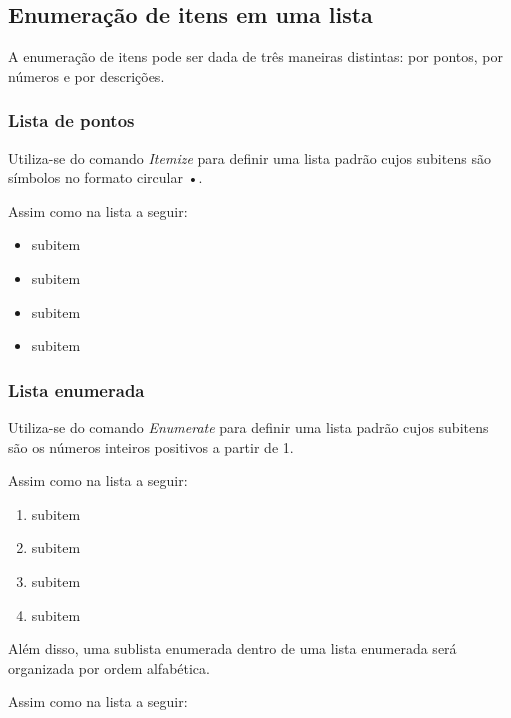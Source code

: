 \documentclass{article}
\begin{document}
\subsection{Enumeração de itens em uma lista}

A enumeração de itens pode ser dada de três maneiras distintas: por pontos, por números e por descrições.

\subsubsection{Lista de pontos}
\begin{flushleft}
Utiliza-se do comando \textit{Itemize} para definir uma lista padrão cujos subitens são símbolos no formato circular •.
\vspace{0.2cm}

Assim como na lista a seguir:
\end{flushleft}

\begin{itemize}
	\item subitem
	\item subitem
	\item subitem
	\item subitem
\end{itemize}

\subsubsection{Lista enumerada}

\begin{flushleft}
Utiliza-se do comando \textit{Enumerate} para definir uma lista padrão cujos subitens são os números inteiros positivos a partir de 1.
\vspace{0.2cm}

Assim como na lista a seguir:
\end{flushleft}

\begin{enumerate}
	\item subitem
	\item subitem
	\item subitem
	\item subitem
\end{enumerate}

\begin{flushleft}

Além disso, uma sublista enumerada dentro de uma lista enumerada será organizada por ordem alfabética.

\vspace{0.2cm}

Assim como na lista a seguir:
\end{flushleft}
\end{document}
